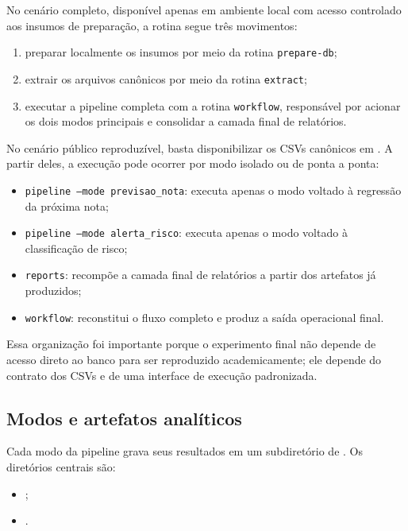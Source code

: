 No cen\'ario completo, dispon\'ivel apenas em ambiente local com acesso controlado aos insumos de prepara\c{c}\~ao, a rotina segue tr\^es movimentos:
\begin{enumerate}
    \item preparar localmente os insumos por meio da rotina \texttt{prepare-db};
    \item extrair os arquivos can\^onicos por meio da rotina \texttt{extract};
    \item executar a pipeline completa com a rotina \texttt{workflow}, respons\'avel por acionar os dois modos principais e consolidar a camada final de relat\'orios.
\end{enumerate}

No cen\'ario p\'ublico reproduz\'ivel, basta disponibilizar os CSVs can\^onicos em . A partir deles, a execu\c{c}\~ao pode ocorrer por modo isolado ou de ponta a ponta:
\begin{itemize}
    \item \texttt{pipeline --mode previsao\_nota}: executa apenas o modo voltado \`a regress\~ao da pr\'oxima nota;
    \item \texttt{pipeline --mode alerta\_risco}: executa apenas o modo voltado \`a classifica\c{c}\~ao de risco;
    \item \texttt{reports}: recomp\~oe a camada final de relat\'orios a partir dos artefatos j\'a produzidos;
    \item \texttt{workflow}: reconstitui o fluxo completo e produz a sa\'ida operacional final.
\end{itemize}

Essa organiza\c{c}\~ao foi importante porque o experimento final n\~ao depende de acesso direto ao banco para ser reproduzido academicamente; ele depende do contrato dos CSVs e de uma interface de execu\c{c}\~ao padronizada.

\subsection{Modos e artefatos anal\'iticos}

Cada modo da pipeline grava seus resultados em um subdiret\'orio de . Os diret\'orios centrais s\~ao:
\begin{itemize}
    \item {};
    \item {}.
\end{itemize}

